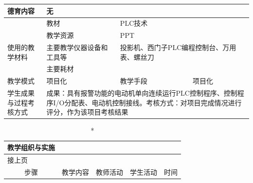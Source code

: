 {\begin{longtable}{|m{20mm}|m{20mm}|m{20mm}|m{20mm}|m{20mm}|m{28mm}|}
\hline
\centering 德育内容 &\multicolumn{5}{m{108mm}|}{无}\\
\hline
 &教材 & \multicolumn{4}{l|}{PLC技术}\\
\cline{2-6}& 教学资源 &\multicolumn{4}{m{88mm}|}{PPT}\\
\cline{2-6}\centering 使用的教学材料& 主要教学仪器设备和工具等 &\multicolumn{4}{m{88mm}|}{投影机、西门子PLC编程控制台、万用表、螺丝刀}\\
\cline{2-6}& 主要耗材 &\multicolumn{4}{m{88mm}|}{\qquad}\\
\hline
\centering 教学模式 &\multicolumn{2}{l|}{项目化}&\centering 教学手段 &\multicolumn{2}{l|}{项目化}\\
\hline
\centering 学生成果与过程考核方式 &\multicolumn{5}{m{108mm}|}{成果：具有报警功能的电动机单向连续运行PLC控制程序、控制程序I/O分配表、电动机控制接线。考核方式：对项目完成情况进行评分，作为该项目考核结果}
\end{longtable}
\clearpage


\begin{landscape}
\begin{longtable}{|m{10mm}|m{50mm}|m{50mm}|m{50mm}|m{15mm}|}
\caption*{\huge 教学组织与实施}\\
\hline
\endfirsthead
\multicolumn{5}{l}{\small 接上页}\\
\hline
\multicolumn{1}{|c|}{步骤}&\multicolumn{1}{c|}{教学内容}&\multicolumn{1}{c|}{教师活动}&\multicolumn{1}{c|}{学生活动}&\multicolumn{1}{c|}{时间}\\
\hline
\endhead


\end{longtable}
\end{landscape}}
